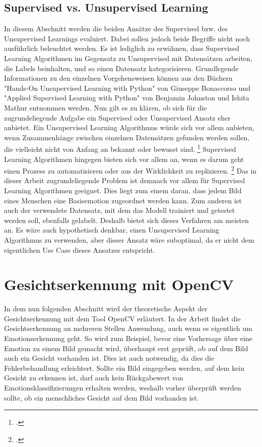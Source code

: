 \documentclass[12pt, a4paper]{report}
\begin{document}
\subsection{Supervised vs. Unsupervised Learning}
In diesem Abschnitt werden die beiden Ansätze des Supervised bzw. des Unsupervised Learnings evaluiert. Dabei sollen jedoch beide Begriffe nicht noch ausführlich beleuchtet werden. Es ist lediglich zu erwähnen, dass Supervised Learning Algorithmen im Gegensatz zu Unsupervised mit Datensätzen arbeiten, die Labels beinhalten, und so einen Datensatz kategorisieren. Grundlegende Informationen zu den einzelnen Vorgehensweisen können aus den Büchern "Hands-On Unsupervised Learning with Python" von Giuseppe Bonaccorso und "Applied Supervised Learning with Python" von Benjamin Johnston und Ishita Mathur entnommen werden. Nun gilt es zu klären, ob sich für die zugrundeliegende Aufgabe ein Supervised oder Unsupervised Ansatz eher anbietet. Ein Unsupervised Learning Algorithmus würde sich vor allem anbieten, wenn Zusammenhänge zwischen einzelnen Datensätzen gefunden werden sollen, die vielleicht nicht von Anfang an bekannt oder bewusst sind.
\footcite[Vgl. ][21]{Unsupervised}
Supervised Learning Algorithmen hingegen bieten sich vor allem an, wenn es darum geht einen Prozess zu automatisieren oder aus der Wirklichkeit zu replizieren.
\footcite[Vgl. ][4]{Supervised}
Das in dieser Arbeit zugrundeliegende Problem ist demnach vor allem für Supervised Learning Algorithmen geeignet. Dies liegt zum einem daran, dass jedem Bild eines Menschen eine Basisemotion zugeordnet werden kann. Zum anderen ist auch der verwendete Datensatz, mit dem das Modell trainiert und getestet werden soll, ebenfalls gelabelt. Deshalb bietet sich dieses Verfahren am meisten an. Es wäre auch hypothetisch denkbar, einen Unsupervised Learning Algorithmus zu verwenden, aber dieser Ansatz wäre suboptimal, da er nicht dem eigentlichen Use Case dieses Ansatzes entspricht.

\section{Gesichtserkennung mit OpenCV}
In dem nun folgenden Abschnitt wird der theoretische Aspekt der Gesichtserkennung mit dem Tool OpenCV erläutert. In der Arbeit findet die Gesichtserkennung an mehreren Stellen Anwendung, auch wenn es eigentlich um Emotionserkennung geht. So wird zum Beispiel, bevor eine Vorhersage über eine Emotion zu einem Bild gemacht wird, überhaupt erst geprüft, ob auf dem Bild auch ein Gesicht vorhanden ist. Dies ist auch notwendig, da dies die Fehlerbehandlung erleichtert. Sollte ein Bild eingegeben werden, auf dem kein Gesicht zu erkennen ist, darf auch kein Rückgabewert von Emotionsklassifizierungen erhalten werden, weshalb vorher überprüft werden sollte, ob ein menschliches Gesicht auf dem Bild vorhanden ist.
\end{document}
